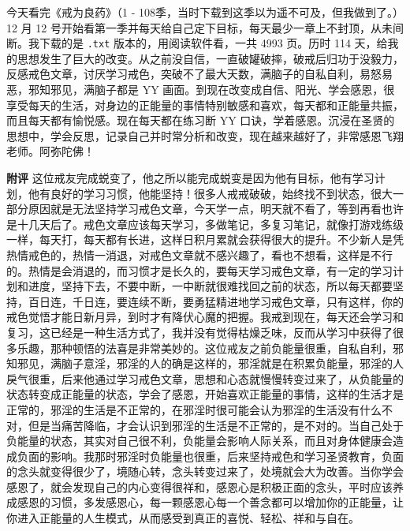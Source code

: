 \begin{case}
    今天看完《戒为良药》（1 - 108季，当时下载到这季以为遥不可及，但我做到了。）12 月 12 号开始看第一季并每天给自己定下目标，每天最少一章上不封顶，从未间断。我下载的是 \texttt{.txt} 版本的，用阅读软件看，一共 4993 页。历时 114 天，给我的思想发生了巨大的改变。从之前没自信，一直破罐破摔，破戒后归功于没毅力，反感戒色文章，讨厌学习戒色，突破不了最大天数，满脑子的自私自利，易怒易恶，邪知邪见，满脑子都是 YY 画面。到现在改变成自信、阳光、学会感恩，很享受每天的生活，对身边的正能量的事情特别敏感和喜欢，每天都和正能量共振，而且每天都有愉悦感。现在每天都在练习断 YY 口诀，学着感恩。沉浸在圣贤的思想中，学会反思，记录自己并时常分析和改变，现在越来越好了，非常感恩飞翔老师。阿弥陀佛！

    \textbf{附评} 这位戒友完成蜕变了，他之所以能完成蜕变是因为他有目标，他有学习计划，他有良好的学习习惯，他能坚持！很多人戒戒破破，始终找不到状态，很大一部分原因就是无法坚持学习戒色文章，今天学一点，明天就不看了，等到再看也许是十几天后了。戒色文章应该每天学习，多做笔记，多复习笔记，就像打游戏练级一样，每天打，每天都有长进，这样日积月累就会获得很大的提升。不少新人是凭热情戒色的，热情一消退，对戒色文章就不感兴趣了，看也不想看，这样是不行的。热情是会消退的，而习惯才是长久的，要每天学习戒色文章，有一定的学习计划和进度，坚持下去，不要中断，一中断就很难找回之前的状态，所以每天都要坚持，百日连，千日连，要连续不断，要勇猛精进地学习戒色文章，只有这样，你的戒色觉悟才能日新月异，到时才有降伏心魔的把握。我戒到现在，每天还会学习和复习，这已经是一种生活方式了，我并没有觉得枯燥乏味，反而从学习中获得了很多乐趣，那种顿悟的法喜是非常美妙的。这位戒友之前负能量很重，自私自利，邪知邪见，满脑子意淫，邪淫的人的确是这样的，邪淫就是在积累负能量，邪淫的人戾气很重，后来他通过学习戒色文章，思想和心态就慢慢转变过来了，从负能量的状态转变成正能量的状态，学会了感恩，开始喜欢正能量的事情，这样的生活才是正常的，邪淫的生活是不正常的，在邪淫时很可能会认为邪淫的生活没有什么不对，但是当痛苦降临，才会认识到邪淫的生活是不正常的，是不对的。当自己处于负能量的状态，其实对自己很不利，负能量会影响人际关系，而且对身体健康会造成负面的影响。我那时邪淫时负能量也很重，后来坚持戒色和学习圣贤教育，负面的念头就变得很少了，境随心转，念头转变过来了，处境就会大为改善。当你学会感恩了，就会发现自己的内心变得很祥和，感恩心是积极正面的念头，平时应该养成感恩的习惯，多发感恩心，每一颗感恩心每一个善念都可以增加你的正能量，让你进入正能量的人生模式，从而感受到真正的喜悦、轻松、祥和与自在。
\end{case}

